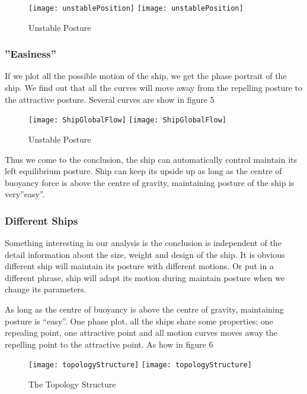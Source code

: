 \begin{figure}[!htbp]
  \begin{center}
    \leavevmode
    \ifpdf
      \texttt{[image: unstablePosition]}
    \else
      \texttt{[image: unstablePosition]}
    \fi
    \caption{Unstable Posture}
    \label{fig:unStablePosture}
  \end{center}
\end{figure}


\subsubsection*{''Easiness''}
If we plot all the possible motion of the ship, we get the phase portrait of the ship. We find out that all the curves will move away from the repelling posture to the attractive posture. Several curves are show in figure 5
\begin{figure}[!htbp]
  \begin{center}
    \leavevmode
    \ifpdf
      \texttt{[image: ShipGlobalFlow]}
    \else
      \texttt{[image: ShipGlobalFlow]}
    \fi
    \caption{Unstable Posture}
    \label{fig:unStablePosture}
  \end{center}
\end{figure}

Thus we come to the conclusion, the ship can automatically control maintain its left equilibrium posture. 
 Ship can keep its upside up as long as the centre of buoyancy force is above the centre of gravity, 
maintaining posture of the ship is very”easy”.


\subsubsection*{Different Ships} 
Something interesting in our analysis is the conclusion is independent of the detail information about the size, weight and design of the ship. 
It is obvious different ship will maintain its posture with different motions. 
Or put in a different phrase, ship will adapt its motion during maintain posture when we change its parameters.

As long as the centre of buoyancy is above the centre of gravity, maintaining posture is “easy”.
One phase plot, all the ships share some properties: one repealing point, one attractive point and all motion curves moves away the repelling point to the attractive point. As how in figure 6

\begin{figure}[!htbp]
  \begin{center}
    \leavevmode
    \ifpdf
      \texttt{[image: topologyStructure]}
    \else
      \texttt{[image: topologyStructure]}
    \fi
    \caption{The Topology Structure}
    \label{fig:topologyStructure}
  \end{center}
\end{figure}


